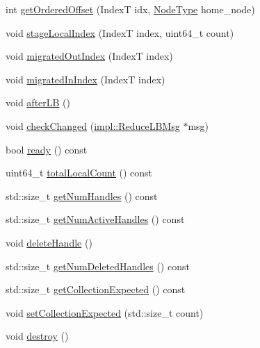 \begin{DoxyCompactItemize}
\item 
int \hyperlink{structvt_1_1rdma_1_1_sub_handle_a739742d5f2e5d5efda43eeb57072c031}{get\+Ordered\+Offset} (IndexT idx, \hyperlink{namespacevt_a866da9d0efc19c0a1ce79e9e492f47e2}{Node\+Type} home\+\_\+node)
\item 
void \hyperlink{structvt_1_1rdma_1_1_sub_handle_a8b51ba1b3d7de1bbe11113e7abfc424c}{stage\+Local\+Index} (IndexT index, uint64\+\_\+t count)
\item 
void \hyperlink{structvt_1_1rdma_1_1_sub_handle_a6723f3d3ff525c3fd8aaca76f781c95d}{migrated\+Out\+Index} (IndexT index)
\item 
void \hyperlink{structvt_1_1rdma_1_1_sub_handle_a0497a34f8aeb5636e5adaa8d8286c5c8}{migrated\+In\+Index} (IndexT index)
\item 
void \hyperlink{structvt_1_1rdma_1_1_sub_handle_a9d441d9e8080998111cc659b8ce725b1}{after\+LB} ()
\item 
void \hyperlink{structvt_1_1rdma_1_1_sub_handle_af872a0071eac521cb813d998763f5a31}{check\+Changed} (\hyperlink{structvt_1_1rdma_1_1impl_1_1_reduce_l_b_msg}{impl\+::\+Reduce\+L\+B\+Msg} $\ast$msg)
\item 
bool \hyperlink{structvt_1_1rdma_1_1_sub_handle_a554fae2fa1466135fe62d37ba8f9b6cf}{ready} () const
\item 
uint64\+\_\+t \hyperlink{structvt_1_1rdma_1_1_sub_handle_ac8c87ae808bf36b1be5235bc17a4e9d4}{total\+Local\+Count} () const
\item 
std\+::size\+\_\+t \hyperlink{structvt_1_1rdma_1_1_sub_handle_a85f238c6e5722b6e9ad9c2eff7c9463f}{get\+Num\+Handles} () const
\item 
std\+::size\+\_\+t \hyperlink{structvt_1_1rdma_1_1_sub_handle_a4e1632734958542eb211fb462e54eebb}{get\+Num\+Active\+Handles} () const
\item 
void \hyperlink{structvt_1_1rdma_1_1_sub_handle_a1d472b924cb0ccfbb7abea085afc9c4d}{delete\+Handle} ()
\item 
std\+::size\+\_\+t \hyperlink{structvt_1_1rdma_1_1_sub_handle_a8760602e62b5ae6c83b32547570f57d5}{get\+Num\+Deleted\+Handles} () const
\item 
std\+::size\+\_\+t \hyperlink{structvt_1_1rdma_1_1_sub_handle_ace1b9d5aa44a6c4474ae8ec2e007a2c6}{get\+Collection\+Expected} () const
\item 
void \hyperlink{structvt_1_1rdma_1_1_sub_handle_aedd53281a11526f637a532c0729404e2}{set\+Collection\+Expected} (std\+::size\+\_\+t count)
\item 
void \hyperlink{structvt_1_1rdma_1_1_sub_handle_a869dcc54734a9ff371e0970af2c2c674}{destroy} ()
\end{DoxyCompactItemize}
